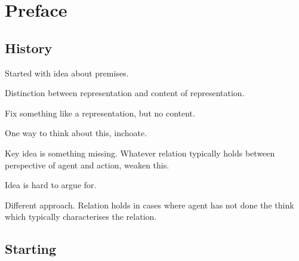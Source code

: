 \chapter{Preface}
\label{cha:preface}

\section{History}

\begin{note}
  Started with idea about premises.

  Distinction between representation and content of representation.

  Fix something like a representation, but no content.

  One way to think about this, inchoate.
\end{note}

\begin{note}
  Key idea is something missing.
  Whatever relation typically holds between perspective of agent and action, weaken this.
\end{note}

\begin{note}
  Idea is hard to argue for.
\end{note}

\begin{note}
  Different approach.
  Relation holds in cases where agent has not done the think which typically characterises the relation.
\end{note}

\section{Starting}
\nocite{Brown:2004us}

